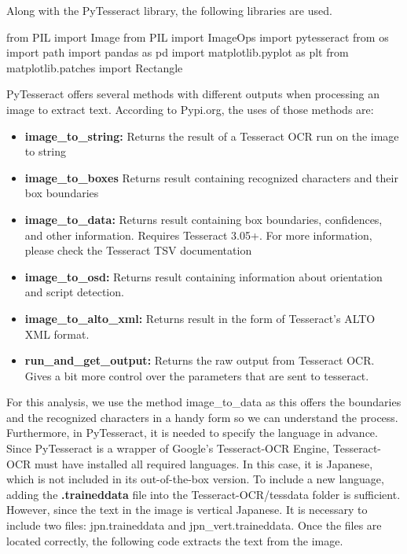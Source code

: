 \documentclass[
]{article}
\newenvironment{Shaded}{\begin{snugshade}}{\end{snugshade}}
\newcommand{\ImportTok}[1]{#1}
\newcommand{\NormalTok}[1]{#1}
\providecommand{\tightlist}{%
  \setlength{\itemsep}{0pt}\setlength{\parskip}{0pt}}
\begin{document}
Along with the PyTesseract library, the following libraries are used.

\begin{Shaded}
\begin{Highlighting}[]
\ImportTok{from}\NormalTok{ PIL }\ImportTok{import}\NormalTok{ Image}
\ImportTok{from}\NormalTok{ PIL }\ImportTok{import}\NormalTok{ ImageOps}
\ImportTok{import}\NormalTok{ pytesseract}
\ImportTok{from}\NormalTok{ os }\ImportTok{import}\NormalTok{ path}
\ImportTok{import}\NormalTok{ pandas }\ImportTok{as}\NormalTok{ pd}
\ImportTok{import}\NormalTok{ matplotlib.pyplot }\ImportTok{as}\NormalTok{ plt}
\ImportTok{from}\NormalTok{ matplotlib.patches }\ImportTok{import}\NormalTok{ Rectangle}
\end{Highlighting}
\end{Shaded}

PyTesseract offers several methods with different outputs when
processing an image to extract text. According to Pypi.org, the uses of
those methods are:

\begin{itemize}
\tightlist
\item
  \textbf{image\_to\_string:} Returns the result of a Tesseract OCR run
  on the image to string
\item
  \textbf{image\_to\_boxes} Returns result containing recognized
  characters and their box boundaries
\item
  \textbf{image\_to\_data:} Returns result containing box boundaries,
  confidences, and other information. Requires Tesseract 3.05+. For more
  information, please check the Tesseract TSV documentation
\item
  \textbf{image\_to\_osd:} Returns result containing information about
  orientation and script detection.
\item
  \textbf{image\_to\_alto\_xml:} Returns result in the form of
  Tesseract's ALTO XML format.
\item
  \textbf{run\_and\_get\_output:} Returns the raw output from Tesseract
  OCR. Gives a bit more control over the parameters that are sent to
  tesseract.
\end{itemize}

For this analysis, we use the method image\_to\_data as this offers the
boundaries and the recognized characters in a handy form so we can
understand the process. Furthermore, in PyTesseract, it is needed to
specify the language in advance. Since PyTesseract is a wrapper of
Google's Tesseract-OCR Engine, Tesseract-OCR must have installed all
required languages. In this case, it is Japanese, which is not included
in its out-of-the-box version. To include a new language, adding the
\textbf{.traineddata} file into the Tesseract-OCR/tessdata folder is
sufficient. However, since the text in the image is vertical Japanese.
It is necessary to include two files: jpn.traineddata and
jpn\_vert.traineddata. Once the files are located correctly, the
following code extracts the text from the image.
\end{document}
